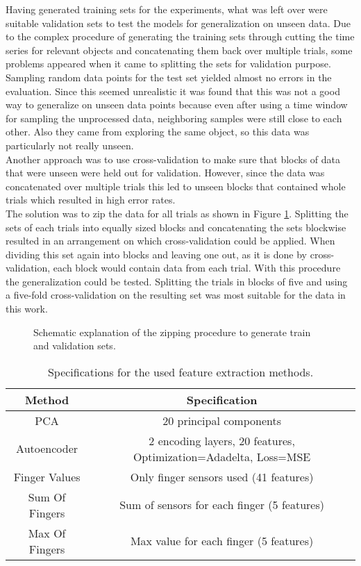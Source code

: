 Having generated training sets for the experiments, what was left over were suitable validation sets to test the models for generalization on unseen data. Due to the complex procedure of generating the training sets through cutting the time series for relevant objects and concatenating them back over multiple trials, some problems appeared when it came to splitting the sets for validation purpose.\\ Sampling random data points for the test set yielded almost no errors in the evaluation. Since this seemed unrealistic it was found that this was not a good way to generalize on unseen data points because even after using a time window for sampling the unprocessed data, neighboring samples were still close to each other. Also they came from exploring the same object, so this data was particularly not really unseen.\\
Another approach was to use cross-validation to make sure that blocks of data that were unseen were held out for validation. However, since the data was concatenated over multiple trials this led to unseen blocks that contained whole trials which resulted in high error rates. \\
The solution was to zip the data for all trials as shown in Figure \ref{zip}. Splitting the sets of each trials into equally sized blocks and concatenating the sets blockwise resulted in an arrangement on which cross-validation could be applied. When dividing this set again into blocks and leaving one out, as it is done by cross-validation, each block would contain data from each trial. With this procedure the generalization could be tested. Splitting the trials in blocks of five and using a five-fold cross-validation on the resulting set was most suitable for the data in this work.

\begin{figure}[h]
	\caption{Schematic explanation of the zipping procedure to generate train and validation sets.}
	\label{zip}
\end{figure}

\begin{table}[H]
\centering
\begin{tabular}{|c|c|}
\hline
Method & Specification \\
\hline\hline
PCA & 20 principal components \\
Autoencoder & 2 encoding layers, 20 features, Optimization=Adadelta, Loss=MSE\\
Finger Values & Only finger sensors used (41 features) \\
Sum Of Fingers & Sum of sensors for each finger (5 features) \\
Max Of Fingers & Max value for each finger (5 features) \\
\hline
\end{tabular}
\caption{Specifications for the used feature extraction methods.}
\label{FE}
\end{table} 

